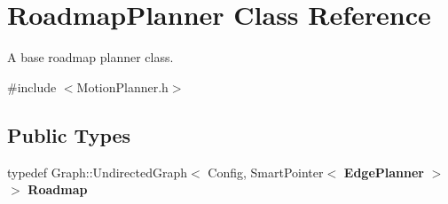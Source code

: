 \section{Roadmap\+Planner Class Reference}
\label{classRoadmapPlanner}


A base roadmap planner class.  




{\ttfamily \#include $<$Motion\+Planner.\+h$>$}

\subsection*{Public Types}
\begin{DoxyCompactItemize}
\item 
typedef Graph\+::\+Undirected\+Graph$<$ Config, Smart\+Pointer$<$ {\bf Edge\+Planner} $>$ $>$ {\bfseries Roadmap}\label{classRoadmapPlanner_a94306f9fcef5ed328271f83a87cde58a}

\end{DoxyCompactItemize}
